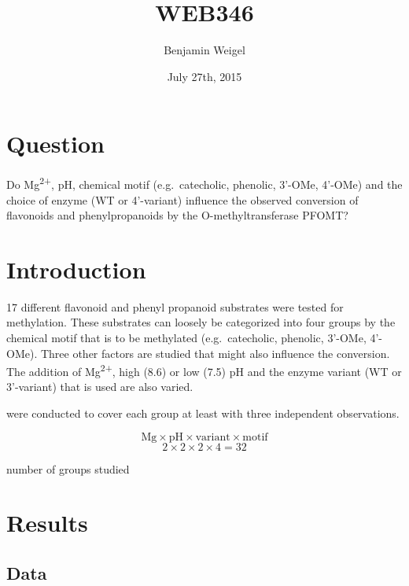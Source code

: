 \documentclass[]{tufte-handout}
\title{WEB346}
\author{Benjamin Weigel}
\date{July 27th, 2015}
\begin{document}
\maketitle



\section{Question}\label{question}

Do Mg\textsuperscript{2+}, pH, chemical motif (e.g.~catecholic,
phenolic, 3'-OMe, 4'-OMe) and the choice of enzyme (WT or 4'-variant)
influence the observed conversion of flavonoids and phenylpropanoids by
the O-methyltransferase PFOMT?

\section{Introduction}\label{introduction}

17 different flavonoid and phenyl propanoid substrates were tested for
methylation. These substrates can loosely be categorized into four
groups by the chemical motif that is to be methylated (e.g.~catecholic,
phenolic, 3'-OMe, 4'-OMe). Three other factors are studied that might
also influence the conversion. The addition of Mg\textsuperscript{2+},
high (8.6) or low (7.5) pH and the enzyme variant (WT or 3'-variant)
that is used are also varied.

 were conducted to cover each
group at least with three independent observations.

\begin{marginfigure}
$$\mathrm{Mg} \times \mathrm{pH} \times \mathrm{variant} \times \mathrm{motif} $$
$$2 \times 2 \times 2 \times 4 = 32$$
\caption{number of groups studied}
\end{marginfigure}

\section{Results}\label{results}

\subsection{Data}\label{data}
\end{document}
